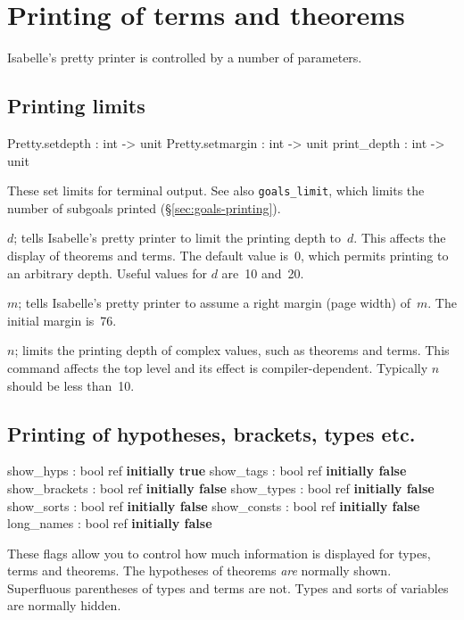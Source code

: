 \section{Printing of terms and theorems}\label{sec:printing-control}
Isabelle's pretty printer is controlled by a number of parameters.

\subsection{Printing limits}
\begin{ttbox} 
Pretty.setdepth  : int -> unit
Pretty.setmargin : int -> unit
print_depth      : int -> unit
\end{ttbox}
These set limits for terminal output.  See also {\tt goals_limit},
which limits the number of subgoals printed
(\S\ref{sec:goals-printing}).

\begin{ttdescription}
\item[\ttindexbold{Pretty.setdepth} \(d\);] tells Isabelle's pretty printer to
  limit the printing depth to~$d$.  This affects the display of theorems and
  terms.  The default value is~0, which permits printing to an arbitrary
  depth.  Useful values for $d$ are~10 and~20.

\item[\ttindexbold{Pretty.setmargin} \(m\);]  
  tells Isabelle's pretty printer to assume a right margin (page width)
  of~$m$.  The initial margin is~76.

\item[\ttindexbold{print_depth} \(n\);]  
  limits the printing depth of complex \ML{} values, such as theorems and
  terms.  This command affects the \ML{} top level and its effect is
  compiler-dependent.  Typically $n$ should be less than~10.
\end{ttdescription}


\subsection{Printing of hypotheses, brackets, types etc.}
\begin{ttbox} 
show_hyps     : bool ref \hfill{\bf initially true}
show_tags     : bool ref \hfill{\bf initially false}
show_brackets : bool ref \hfill{\bf initially false}
show_types    : bool ref \hfill{\bf initially false}
show_sorts    : bool ref \hfill{\bf initially false}
show_consts   : bool ref \hfill{\bf initially false}
long_names    : bool ref \hfill{\bf initially false}
\end{ttbox}
These flags allow you to control how much information is displayed for
types, terms and theorems.  The hypotheses of theorems \emph{are}
normally shown.  Superfluous parentheses of types and terms are not.
Types and sorts of variables are normally hidden.


